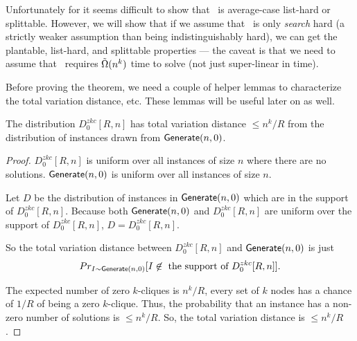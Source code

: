 Unfortunately for it seems difficult to show that \kSum~is average-case list-hard or splittable. However, we will show that if we assume that \zkclique~is only \emph{search} hard (a strictly weaker assumption than being indistinguishably hard), we can get the plantable, list-hard, and splittable properties --- the caveat is that we need to assume that \zkclique~requires $\~\Omega(n^k)$ time to solve (not just super-linear in time).

Before proving the theorem, we need a couple of helper lemmas to characterize the total variation distance, etc. These lemmas will be useful later on as well.

\begin{lemma}
	The distribution $D^{zkc}_{0}[R,n]$ has total variation distance $\leq n^k/R$ from the distribution of instances drawn from $\Generate(n,0)$.
	\label{lem:TVDnosol}
\end{lemma}
\begin{proof}	
	$D^{zkc}_{0}[R,n]$ is uniform over all instances of size $n$ where there are no solutions. $\Generate(n,0)$ is uniform over all instances of size $n$. 
	
	Let $D$ be the distribution of instances in $\Generate(n,0)$ which are in the support of $D^{zkc}_{0}[R,n]$. Because both $\Generate(n,0)$ and $D^{zkc}_{0}[R,n]$ are uniform over the support of $D^{zkc}_{0}[R,n]$, $D = D^{zkc}_{0}[R,n]$.
	
	So the total variation distance between $D^{zkc}_{0}[R,n]$ and $\Generate(n,0)$ is just 
	$$Pr_{I \sim \Generate(n,0)}[I \nin \text{ the support of } D^{zkc}_{0}[R,n]].$$
	
	The expected number of zero $k$-cliques is $n^k/R$, every set of $k$ nodes has a chance of $1/R$ of being a zero $k$-clique. Thus, the probability that an instance has a non-zero number of solutions is $\leq n^k/R$. So, the total variation distance is $\leq n^k/R$.
\end{proof}


